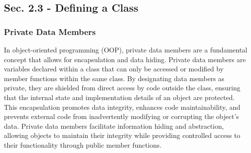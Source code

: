 \subsection*{Sec. 2.3 - Defining a Class}
\subsubsection*{Private Data Members}

In object-oriented programming (OOP), private data members are a fundamental concept that allows for encapsulation and data hiding. Private data members are variables declared within a class that can only be accessed or modified by member functions within the same class. 
By designating data members as private, they are shielded from direct access by code outside the class, ensuring that the internal state and implementation details of an object are protected. This encapsulation promotes data integrity, enhances code maintainability, and 
prevents external code from inadvertently modifying or corrupting the object's data. Private data members facilitate information hiding and abstraction, allowing objects to maintain their integrity while providing controlled access to their functionality through public 
member functions.

